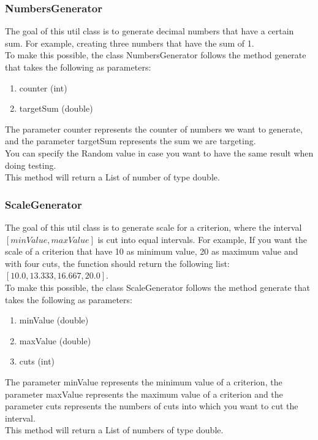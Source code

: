 \documentclass{report}
\begin{document}
\subsubsection{NumbersGenerator}
The goal of this util class is to generate decimal numbers that have a certain sum. For example, creating three numbers that have the sum of 1. \\
To make this possible, the class NumbersGenerator follows the method generate that takes the following as parameters: 
\begin{enumerate}
\item counter (int)
\item targetSum (double)
\end{enumerate} 
The parameter counter represents the counter of numbers we want to generate, and the parameter targetSum represents the sum we are targeting. \\
You can specify the Random value in case you want to have the same result when doing testing. \\
This method will return a List of number of type double. 

\subsubsection{ScaleGenerator}
The goal of this util class is to generate scale for a criterion, where the interval $[minValue, maxValue]$ is cut into equal intervals. For example, If you want the scale of a criterion that have 10 as minimum value, 20 as maximum value and with four cuts, the function should return the following list: $[10.0, 13.333, 16.667, 20.0]$.\\
To make this possible, the class ScaleGenerator follows the method generate that takes the following as parameters: 
\begin{enumerate}
\item minValue (double)
\item maxValue (double)
\item cuts (int)
\end{enumerate} 
The parameter minValue represents the minimum value of a criterion, the parameter maxValue represents the maximum value of a criterion and the parameter cuts represents the numbers of cuts into which you want to cut the interval. \\
This method will return a List of numbers of type double. 
\end{document}
